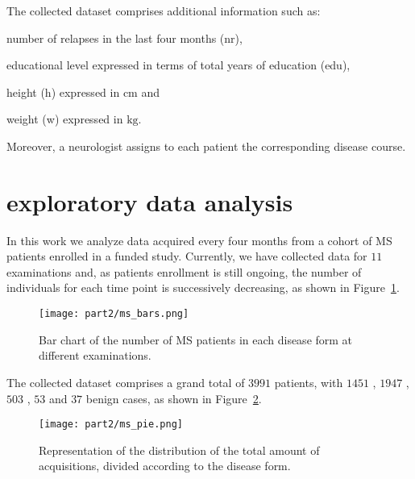 The collected \PCO dataset comprises additional information such as:
\begin{enumerate*}[label=\roman*)]
	\item number of relapses in the last four months ({\sc nr}),
	\item educational level expressed in terms of total years of education ({\sc edu}),
	\item height ({\sc h}) expressed in $\text{cm}$ and
	\item weight ({\sc w}) expressed in $\text{kg}$.
\end{enumerate*}
Moreover, a neurologist assigns to each patient the corresponding disease course.


\section{\PCOs exploratory data analysis} \label{sec:aism_eda}


In this work we analyze \PCOs data acquired every four months from a cohort of MS patients enrolled in a funded study.
Currently, we have collected data for $11$ examinations and, as patients enrollment is still ongoing,  the number of individuals for each time point is successively decreasing, as shown in Figure~\ref{fig:patients}.
\begin{figure}[]
	\centering
	\texttt{[image: part2/ms\_bars.png]}
	\caption{Bar chart of the number of MS patients in each disease form  at different examinations.} \label{fig:patients}
\end{figure}

The collected dataset comprises a grand total of $3991$ patients, with $1451$ \RR, $1947$ \SP, $503$ \PP, $53$ \PR and $37$ benign cases, as shown in Figure~\ref{fig:PPRRSP}.
\begin{figure}[]
	\centering
	\texttt{[image: part2/ms\_pie.png]}
	\caption{Representation of the distribution of the total amount of acquisitions, divided according to the disease form.} \label{fig:PPRRSP}
\end{figure}

